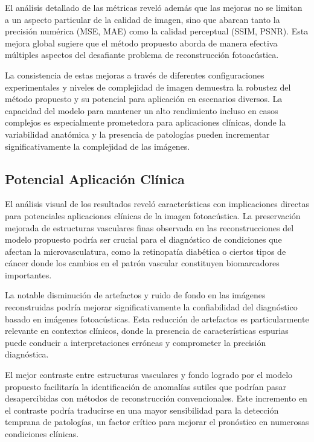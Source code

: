 El análisis detallado de las métricas reveló además que las mejoras no se limitan a un aspecto particular de la calidad de imagen, sino que abarcan tanto la precisión numérica (MSE, MAE) como la calidad perceptual (SSIM, PSNR). Esta mejora global sugiere que el método propuesto aborda de manera efectiva múltiples aspectos del desafiante problema de reconstrucción fotoacústica.

La consistencia de estas mejoras a través de diferentes configuraciones experimentales y niveles de complejidad de imagen demuestra la robustez del método propuesto y su potencial para aplicación en escenarios diversos. La capacidad del modelo para mantener un alto rendimiento incluso en casos complejos es especialmente prometedora para aplicaciones clínicas, donde la variabilidad anatómica y la presencia de patologías pueden incrementar significativamente la complejidad de las imágenes.

\subsection{Potencial Aplicación Clínica}

El análisis visual de los resultados reveló características con implicaciones directas para potenciales aplicaciones clínicas de la imagen fotoacústica. La preservación mejorada de estructuras vasculares finas observada en las reconstrucciones del modelo propuesto podría ser crucial para el diagnóstico de condiciones que afectan la microvasculatura, como la retinopatía diabética o ciertos tipos de cáncer donde los cambios en el patrón vascular constituyen biomarcadores importantes.

La notable disminución de artefactos y ruido de fondo en las imágenes reconstruidas podría mejorar significativamente la confiabilidad del diagnóstico basado en imágenes fotoacústicas. Esta reducción de artefactos es particularmente relevante en contextos clínicos, donde la presencia de características espurias puede conducir a interpretaciones erróneas y comprometer la precisión diagnóstica.

El mejor contraste entre estructuras vasculares y fondo logrado por el modelo propuesto facilitaría la identificación de anomalías sutiles que podrían pasar desapercibidas con métodos de reconstrucción convencionales. Este incremento en el contraste podría traducirse en una mayor sensibilidad para la detección temprana de patologías, un factor crítico para mejorar el pronóstico en numerosas condiciones clínicas.

